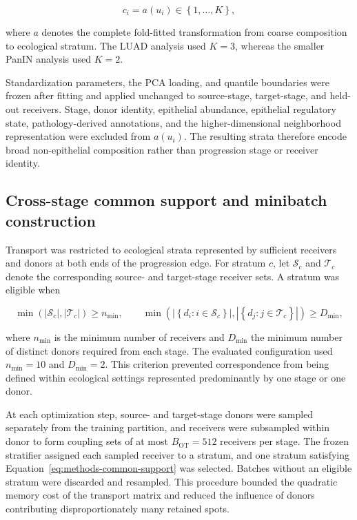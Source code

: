 \begin{equation}
c_i
=
a(u_i)
\in
\left\{
1,\ldots,K
\right\},
\label{eq:methods-stratum-assignment}
\end{equation}

where \(a\) denotes the complete fold-fitted transformation from coarse
composition to ecological stratum. The LUAD analysis used \(K=3\), whereas the
smaller PanIN analysis used \(K=2\).

Standardization parameters, the PCA loading, and quantile boundaries were
frozen after fitting and applied unchanged to source-stage, target-stage, and
held-out receivers. Stage, donor identity, epithelial abundance, epithelial
regulatory state, pathology-derived annotations, and the higher-dimensional
neighborhood representation were excluded from \(a(u_i)\). The resulting
strata therefore encode broad non-epithelial composition rather than
progression stage or receiver identity.

\subsection{Cross-stage common support and minibatch construction}
\label{sec:methods-common-support}
\label{sec:methods-coupling-minibatch}

Transport was restricted to ecological strata represented by sufficient
receivers and donors at both ends of the progression edge. For stratum \(c\),
let \(\mathcal{S}_c\) and \(\mathcal{T}_c\) denote the corresponding source-
and target-stage receiver sets. A stratum was eligible when

\begin{equation}
\min\!\left(
\left|\mathcal{S}_c\right|,
\left|\mathcal{T}_c\right|
\right)
\geq
n_{\min},
\qquad
\min\!\left(
\left|\left\{d_i:i\in\mathcal{S}_c\right\}\right|,
\left|\left\{d_j:j\in\mathcal{T}_c\right\}\right|
\right)
\geq
D_{\min},
\label{eq:methods-common-support}
\end{equation}

where \(n_{\min}\) is the minimum number of receivers and \(D_{\min}\) the
minimum number of distinct donors required from each stage. The evaluated
configuration used \(n_{\min}=10\) and \(D_{\min}=2\). This criterion prevented
correspondence from being defined within ecological settings represented
predominantly by one stage or one donor.

At each optimization step, source- and target-stage donors were sampled
separately from the training partition, and receivers were subsampled within
donor to form coupling sets of at most \(B_{\mathrm{OT}}=512\) receivers per
stage. The frozen stratifier assigned each sampled receiver to a stratum, and
one stratum satisfying Equation~\ref{eq:methods-common-support} was selected.
Batches without an eligible stratum were discarded and resampled. This
procedure bounded the quadratic memory cost of the transport matrix and reduced
the influence of donors contributing disproportionately many retained spots.


